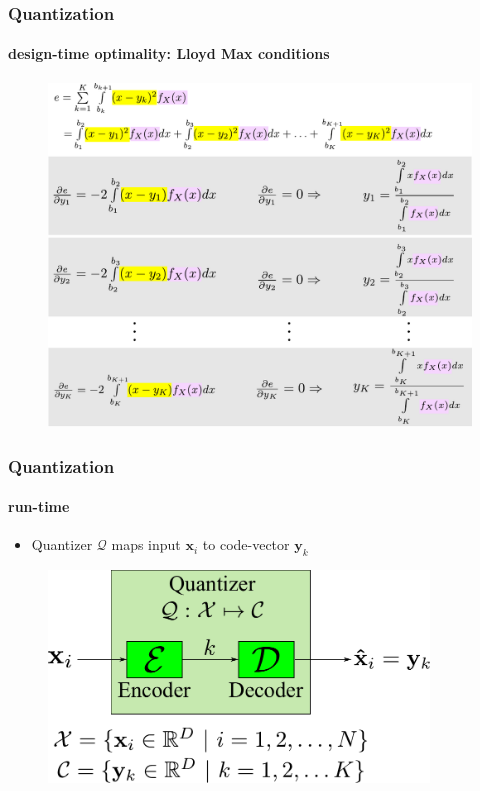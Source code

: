 \begin{frame}
\frametitle{Quantization}
\framesubtitle{design-time optimality: Lloyd Max conditions}
\logoCSIPCPL\mypagenum
\begin{figure}				
\includegraphics[height=0.75\textheight]{thesis/Quantization_optimalCodevectors.pdf}
\end{figure}
\end{frame}


\begin{frame}
\frametitle{Quantization}
\framesubtitle{run-time}
\logoCSIPCPL\mypagenum
\begin{itemize}
\item Quantizer $\mathcal{Q}$ maps input $\mathbf{x}_i$ to code-vector $\mathbf{y}_k$
\end{itemize}
\begin{figure}				
\includegraphics[width=0.9\textwidth]{thesis/Quantization_blockDiagram.pdf}
\end{figure}
\end{frame}




